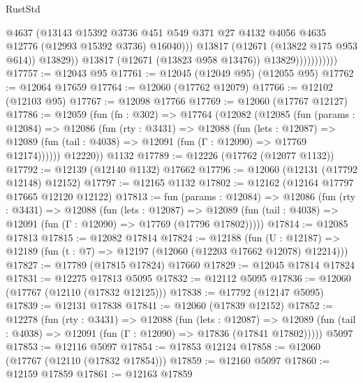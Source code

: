 \begin{lexlean}{RustStd}
\begin{coremodule}
                                  @4637
                                  (@13143
                                    @15392
                                    @3736
                                    @451
                                    @549
                                    @371
                                    @27
                                    @4132
                                    @4056
                                    @4635
                                    @12776
                                    (@12993 @15392 @3736)
                                    @16040)))
                              @13817
                              (@12671 (@13822 @175 @953 @614))
                              @13829))
                          @13817
                          (@12671 (@13823 @958 @13476))
                          @13829)))))))))))
@17757 := @12043 @95
@17761 := @12045 (@12049 @95) (@12055 @95)
@17762 := @12064 @17659
@17764 := @12060 (@17762 @12079)
@17766 := @12102 (@12103 @95)
@17767 := @12098 @17766
@17769 := @12060 (@17767 @12127)
@17786 := @12059
    (fun (fn : @302) =>
    @17764
      (@12082
        (@12085
          (fun (params : @12084) =>
          @12086
            (fun (rty : @3431) =>
            @12088
              (fun (lets : @12087) =>
              @12089 (fun (tail : @4038) => @12091 (fun (Γ : @12090) => @17769 @12174))))))
        @12220))
    @1132
@17789 := @12226 (@17762 (@12077 @1132))
@17792 := @12139 (@12140 @1132) @17662
@17796 := @12060 (@12131 (@17792 @12148) @12152)
@17797 := @12165 @1132
@17802 := @12162 (@12164 @17797 @17665 @12120 @12122)
@17813 := fun (params : @12084) =>
  @12086
    (fun (rty : @3431) =>
    @12088
      (fun (lets : @12087) =>
      @12089 (fun (tail : @4038) => @12091 (fun (Γ : @12090) => @17769 (@17796 @17802)))))
@17814 := @12085 @17813
@17815 := @12082 @17814
@17824 := @12188
    (fun (U : @12187) => @12189 (fun (t : @7) => @12197 (@12060 (@12203 @17662 @12078) @12214)))
@17827 := @17789 (@17815 @17824) @17660
@17829 := @12045 @17814 @17824
@17831 := @12275 @17813 @5095
@17832 := @12112 @5095
@17836 := @12060 (@17767 (@12110 (@17832 @12125)))
@17838 := @17792 (@12147 @5095)
@17839 := @12131 @17838
@17841 := @12060 (@17839 @12152)
@17852 := @12278
    (fun (rty : @3431) =>
    @12088
      (fun (lets : @12087) =>
      @12089 (fun (tail : @4038) => @12091 (fun (Γ : @12090) => @17836 (@17841 @17802)))))
    @5097
@17853 := @12116 @5097
@17854 := @17853 @12124
@17858 := @12060 (@17767 (@12110 (@17832 @17854)))
@17859 := @12160 @5097
@17860 := @12159 @17859
@17861 := @12163 @17859

\end{coremodule}
\end{lexlean}
